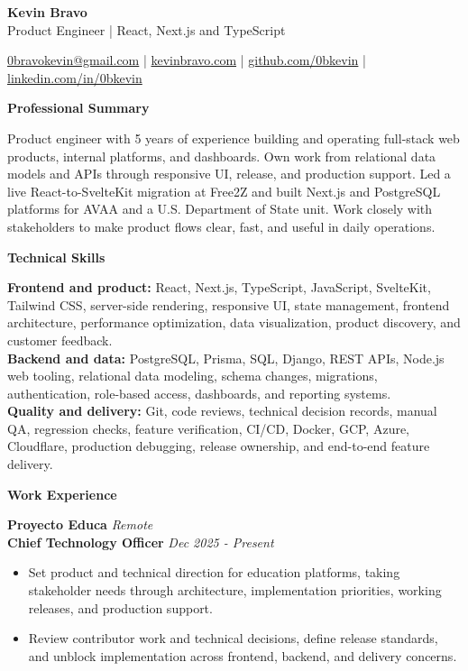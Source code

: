 \documentclass[10pt]{article}
\newcommand{\sectiontitle}[1]{%
    \vspace{4pt}
    \begin{center}
        \textbf{#1}
    \end{center}
    \vspace{-5pt}
}
\begin{document}
\raggedright

\begin{center}
    {\LARGE \textbf{Kevin Bravo}}\\
    Product Engineer | React, Next.js and TypeScript \\
    \hrulefill
\end{center}

\begin{center}
    \href{mailto:0bravokevin@gmail.com}{0bravokevin@gmail.com}
    | \href{https://kevinbravo.com}{kevinbravo.com}
    | \href{https://github.com/0bkevin}{github.com/0bkevin}
    | \href{https://www.linkedin.com/in/0bkevin}{linkedin.com/in/0bkevin}
\end{center}

\fontsize{9.45}{10.35}\selectfont

\sectiontitle{Professional Summary}
Product engineer with 5 years of experience building and operating full-stack web products, internal platforms, and dashboards. Own work from relational data models and APIs through responsive UI, release, and production support. Led a live React-to-SvelteKit migration at Free2Z and built Next.js and PostgreSQL platforms for AVAA and a U.S. Department of State unit. Work closely with stakeholders to make product flows clear, fast, and useful in daily operations.

\sectiontitle{Technical Skills}
\textbf{Frontend and product:} React, Next.js, TypeScript, JavaScript, SvelteKit, Tailwind CSS, server-side rendering, responsive UI, state management, frontend architecture, performance optimization, data visualization, product discovery, and customer feedback. \\
\textbf{Backend and data:} PostgreSQL, Prisma, SQL, Django, REST APIs, Node.js web tooling, relational data modeling, schema changes, migrations, authentication, role-based access, dashboards, and reporting systems. \\
\textbf{Quality and delivery:} Git, code reviews, technical decision records, manual QA, regression checks, feature verification, CI/CD, Docker, GCP, Azure, Cloudflare, production debugging, release ownership, and end-to-end feature delivery.

\sectiontitle{Work Experience}
\textbf{Proyecto Educa} \hfill \textit{Remote} \\
\textbf{Chief Technology Officer} \hfill \textit{Dec 2025 - Present}
\begin{itemize}
    \item Set product and technical direction for education platforms, taking stakeholder needs through architecture, implementation priorities, working releases, and production support.
    \item Review contributor work and technical decisions, define release standards, and unblock implementation across frontend, backend, and delivery concerns.
\end{itemize}
\end{document}
